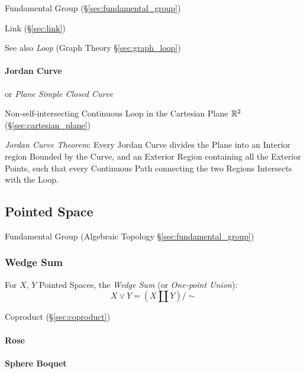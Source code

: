 Fundamental Group (\S\ref{sec:fundamental_group})

Link (\S\ref{sec:link})

\fist See also \emph{Loop} (Graph Theory \S\ref{sec:graph_loop})



\paragraph{Jordan Curve}\label{sec:jordan_curve}\hfill

or \emph{Plane Simple Closed Curve}

Non-self-intersecting Continuous Loop in the Cartesian Plane $\mathbb{R}^2$
(\S\ref{sec:cartesian_plane})

\emph{Jordan Curve Theorem}: Every Jordan Curve divides the Plane into an
Interior region Bounded by the Curve, and an Exterior Region containing all the
Exterior Points, such that every Continuous Path connecting the two Regions
Intersects with the Loop.



\subsection{Pointed Space}\label{sec:pointed_space}

\fist Fundamental Group (Algebraic Topology \S\ref{sec:fundamental_group})



\subsubsection{Wedge Sum}\label{sec:wedge_sum}

For $X$, $Y$ Pointed Spaces, the \emph{Wedge Sum} (or \emph{One-point
  Union}):
\[
  X \vee Y = (X \amalg Y) / \sim
\]

Coproduct (\S\ref{sec:coproduct})



\paragraph{Rose}\label{sec:rose}\hfill

\paragraph{Sphere Boquet}\label{sec:sphere_boquet}\hfill



